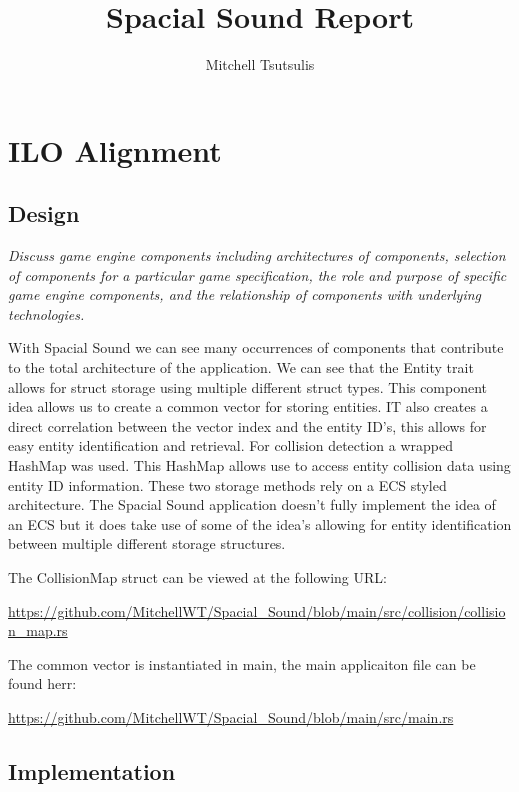 \documentclass{article}
\author{Mitchell Tsutsulis}
\title{Spacial Sound Report}
\begin{document}
\maketitle

\section*{ILO Alignment}

\subsection*{Design}

\emph{Discuss game engine components including architectures of components, selection of components for a particular game specification, the role and purpose of specific game engine components, and the relationship of components with underlying technologies.}

\medskip

With Spacial Sound we can see many occurrences of components that contribute to the total architecture of the application. We can see that the Entity trait allows for struct storage using  multiple different struct types. This component idea allows us to create a common vector for storing entities. IT also creates a direct correlation between the vector index and the entity ID's, this allows for easy entity identification and retrieval. For collision detection a wrapped HashMap was used. This HashMap allows use to access entity collision data using entity ID information. These two storage methods rely on a ECS styled architecture. The Spacial Sound application doesn't fully implement the idea of an ECS but it does take use of some of the idea's allowing for entity identification between multiple different storage structures.

\medskip 

The CollisionMap struct can be viewed at the following URL:

\url{https://github.com/MitchellWT/Spacial_Sound/blob/main/src/collision/collision_map.rs}

\smallskip

The common vector is instantiated in main, the main applicaiton file can be found herr:

\url{https://github.com/MitchellWT/Spacial_Sound/blob/main/src/main.rs}

\subsection*{Implementation}
\end{document}
